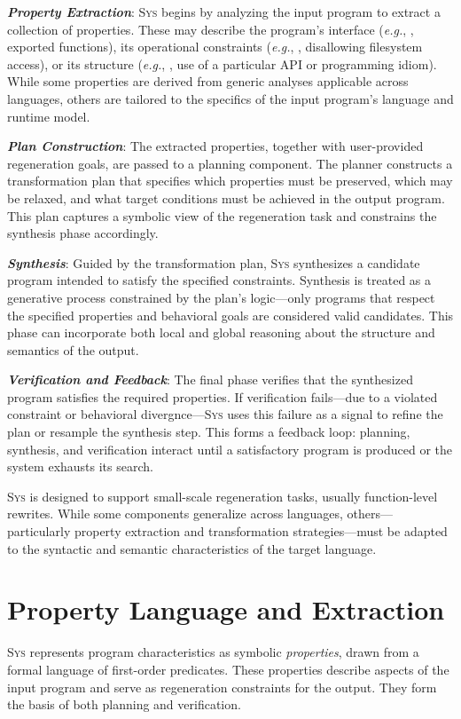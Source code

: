 \documentclass[sigplan]{acmart}
\def\eg{{\em e.g.}, }
\newcommand{\sys}{{\scshape Sys}\xspace}
\newcommand{\heading}[1]{\vspace{2pt}\noindent\textbf{\emph{#1}}:\enspace}
\begin{document}
\heading{Property Extraction} \sys begins by analyzing the input program to
extract a collection of properties. These may describe the program’s interface
(\eg, exported functions), its operational constraints (\eg, disallowing
filesystem access), or its structure (\eg, use of a particular API or
programming idiom). While some properties are derived from generic analyses
applicable across languages, others are tailored to the specifics of the input
program’s language and runtime model.

\heading{Plan Construction} The extracted properties, together with
user-provided regeneration goals, are passed to a planning component. The
planner constructs a transformation plan that specifies which properties must
be preserved, which may be relaxed, and what target conditions must be achieved
in the output program. This plan captures a symbolic view of the regeneration
task and constrains the synthesis phase accordingly.

\heading{Synthesis} Guided by the transformation plan, \sys synthesizes a
candidate program intended to satisfy the specified constraints. Synthesis is
treated as a generative process constrained by the plan’s logic---only programs
that respect the specified properties and behavioral goals are considered valid
candidates. This phase can incorporate both local and global reasoning about
the structure and semantics of the output.

\heading{Verification and Feedback} The final phase verifies that the
synthesized program satisfies the required properties. If verification
fails---due to a violated constraint or behavioral divergnce---\sys uses this
failure as a signal to refine the plan or resample the synthesis step. This
forms a feedback loop: planning, synthesis, and verification interact until a
satisfactory program is produced or the system exhausts its search.

\sys is designed to support small-scale regeneration tasks,
usually function-level rewrites.
While some components generalize across languages, others---particularly
property extraction and transformation strategies---must be adapted to the
syntactic and semantic characteristics of the target language.

\section{Property Language and Extraction}

\sys represents program characteristics as symbolic \emph{properties}, drawn from a formal language of first-order predicates. These properties describe aspects of the input program and serve as regeneration constraints for the output. They form the basis of both planning and verification.
\end{document}
